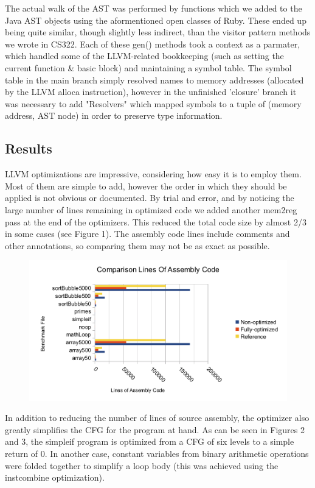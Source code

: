 \documentclass[11pt]{article} %
\begin{document}
The actual walk of the AST was performed by functions which we added to the Java AST objects using the aformentioned open classes of Ruby. These ended up being quite similar, though slightly less indirect, than the visitor pattern methods we wrote in CS322. Each of these gen() methods took a context as a parmater, which handled some of the LLVM-related bookkeeping (such as setting the current function \& basic block) and maintaining a symbol table. The symbol table in the main branch simply resolved names to memory addresses (allocated by the LLVM alloca instruction), however in the unfinished 'closure' branch it was necessary to add "Resolvers" which mapped symbols to a tuple of (memory address, AST node) in order to preserve type information.

\subsection{Results}

LLVM optimizations are impressive, considering how easy it is to employ them. Most of them are simple to add, however the order in which they should be applied is not obvious or documented. By trial and error, and by noticing the large number of lines remaining in optimized code we added another mem2reg pass at the end of the optimizers. This reduced the total code size by almost 2/3 in some cases (see Figure 1). The assembly code lines include comments and other annotations, so comparing them may not be as exact as possible.

\begin{figure}[h!]
\caption{}
\includegraphics{sloc.png}
\end{figure}

In addition to reducing the number of lines of source assembly, the optimizer also greatly simplifies the CFG for the program at hand. As can be seen in Figures 2 and 3, the simpleif program is optimized from a CFG of six levels to a simple return of 0. In another case, constant variables from binary arithmetic operations were folded together to simplify a loop body (this was achieved using the instcombine optimization).
\end{document}

